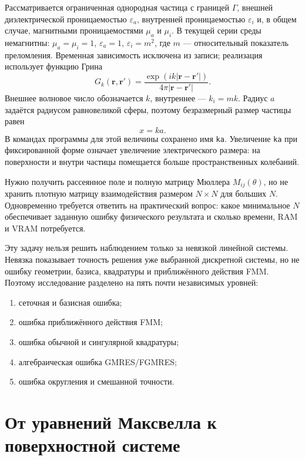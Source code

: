 \documentclass[12pt,a4paper]{article}
\newcommand{\vr}{\mathbf{r}}
\begin{document}
Рассматривается ограниченная однородная частица с границей $\Gamma$, внешней
диэлектрической проницаемостью $\varepsilon_a$, внутренней проницаемостью
$\varepsilon_i$ и, в общем случае, магнитными проницаемостями $\mu_a$ и
$\mu_i$. В текущей серии среды немагнитны: $\mu_a=\mu_i=1$,
$\varepsilon_a=1$, $\varepsilon_i=m^2$, где $m$ --- относительный показатель
преломления. Временная зависимость исключена из записи; реализация использует
функцию Грина
\begin{equation}
  G_k(\vr,\vr')=\frac{\exp(ik|\vr-\vr'|)}{4\pi|\vr-\vr'|}.
  \label{eq:green}
\end{equation}
Внешнее волновое число обозначается $k$, внутреннее --- $k_i=mk$. Радиус $a$
задаётся радиусом равновеликой сферы, поэтому безразмерный размер частицы равен
\begin{equation}
  x=ka.
\end{equation}
В командах программы для этой величины сохранено имя \texttt{ka}. Увеличение
\texttt{ka} при фиксированной форме означает увеличение электрического размера:
на поверхности и внутри частицы помещается больше пространственных колебаний.

Нужно получить рассеянное поле и полную матрицу Мюллера
$M_{ij}(\theta)$, но не хранить плотную матрицу взаимодействия размером
$N\times N$ для больших $N$. Одновременно требуется ответить на практический
вопрос: какое минимальное $N$ обеспечивает заданную ошибку физического
результата и сколько времени, RAM и VRAM потребуется.

Эту задачу нельзя решить наблюдением только за невязкой линейной системы.
Невязка показывает точность решения уже выбранной дискретной системы, но не
ошибку геометрии, базиса, квадратуры и приближённого действия FMM. Поэтому
исследование разделено на пять почти независимых уровней:
\begin{enumerate}
  \item сеточная и базисная ошибка;
  \item ошибка приближённого действия FMM;
  \item ошибка обычной и сингулярной квадратуры;
  \item алгебраическая ошибка GMRES/FGMRES;
  \item ошибка округления и смешанной точности.
\end{enumerate}

\section{От уравнений Максвелла к поверхностной системе}
\end{document}
